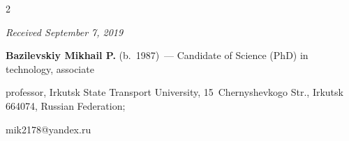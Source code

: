 \begin{multicols}{2}
{{





 }


 }





\end{multicols}





\vspace*{-6pt}





\hfill{\small\textit{Received September 7, 2019}}





















\Contrl





\noindent


\textbf{Bazilevskiy Mikhail P.} (b.\ 1987)~--- Candidate of Science (PhD) in technology, associate 


professor, Irkutsk State Transport University, 15~Chernyshevkogo Str., Irkutsk 664074, Russian Federation; 


\mbox{mik2178@yandex.ru}


\label{end\stat}





\renewcommand{\bibname}{\protect\rm Литература} 


